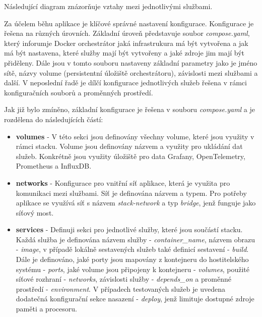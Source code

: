 Následující diagram znázorňuje vztahy mezi jednotlivými službami.


Za účelem běhu aplikace je klíčové správné nastavení konfigurace. Konfigurace je řešena na různých úrovních. Základní úroveň představuje soubor \emph{compose.yaml}, který inforumje Docker orchestrátor jaká infrastrukura má být vytvořena a jak má být nastavena, které služby mají být vytvořeny a jaké zdroje jim mají být přiděleny. Dále jsou v tomto souboru nastaveny základní parametry jako je jméno sítě, názvy volume (persistentní úložiště orchestrátoru), závislosti mezi službami a další. V neposlední řadě je dílčí konfigurace jednotlivých služeb řešena v rámci konfiguračních souborů a proměnných prostředí.


Jak již bylo zmíněno, základní konfigurace je řešena v souboru \emph{compose.yaml} a je rozdělena do následujících částí:

\begin{itemize}
  \item \textbf{volumes} - V této sekci jsou definovány všechny volume, které jsou využity v rámci stacku. Volume jsou definovány názvem a využity pro ukládání dat služeb. Konkrétně jsou využity úložiště pro data Grafany, OpenTelemetry, Prometheus a InfluxDB.
  \item \textbf{networks} - Konfigurace pro vnitřní síť aplikace, která je využita pro komunikaci mezi službami. Síť je definována názvem a typem. Pro potřeby aplikace se využívá síť s názvem \emph{stack-network} a typ \emph{bridge}, jenž funguje jako síťový most.
  \item \textbf{services} - Definuji sekci pro jednotlivé služby, které jsou součástí stacku. Každá služba je definována názvem služby - \emph{container\_name}, názvem obrazu - \emph{image}, v případě lokálně sestavených služeb také definicí sestavení - \emph{build}. Dále je definováno, jaké porty jsou mapovány z kontejneru do hostitelského systému - \emph{ports}, jaké volume jsou připojeny k kontejneru - \emph{volumes}, použité síťové rozhraní - \emph{networks}, závislosti služby - \emph{depends\_on} a proměnné prostředí - \emph{environment}. V případech testovaných služeb je uvedena dodatečná konfigurační sekce nasazení - \emph{deploy}, jenž limituje dostupné zdroje paměti a procesoru.
\end{itemize}


